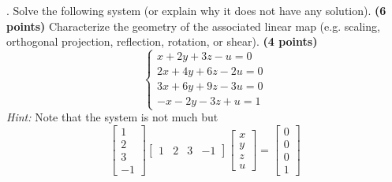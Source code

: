 \documentclass[12pt,a4paper]{article}
\newcommand{\gray}[1]{\textcolor{gray}{}}
\renewcommand{\l}{\left}
\renewcommand{\r}{\right}
\def\R{\ifmmode\mathbb R\fi}
\begin{document}
\newpage
{}. Solve the following system (or explain why it does not have any solution). \textbf{(6 points)} Characterize the geometry of the associated linear map (e.g. scaling, orthogonal projection, reflection, rotation, or shear). \textbf{(4 points)}
\begin{equation*}
	\l\{
	\begin{array}{l}
		x+2y+3z-u=0\\
		2x+4y+6z-2u=0\\
		3x+6y+9z-3u=0\\
		-x-2y-3z+u=1
	\end{array}
	\r.
\end{equation*}
\textit{Hint:} Note that the system is not much but 
$$
	\l[
	\begin{array}{c}
		1\\
		2\\
		3\\
		-1
	\end{array}
	\r]
	\l[
	\begin{array}{cccc}
		1 & 2 & 3 & -1
	\end{array}
	\r]
	\l[
	\begin{array}{c}
		x\\
		y\\
		z\\
		u
	\end{array}
	\r]
	=
	\l[
	\begin{array}{c}
		0\\
		0\\
		0\\
		1
	\end{array}
	\r]
$$
\gray{
This system has no solution as $(0, 0, 0, 1) \notin L = \{\alpha(1, 2, 3, -1) : \alpha\in\R\}$, where the linear map is not much but $\mbox{proj}_L$.
}
\end{document}
